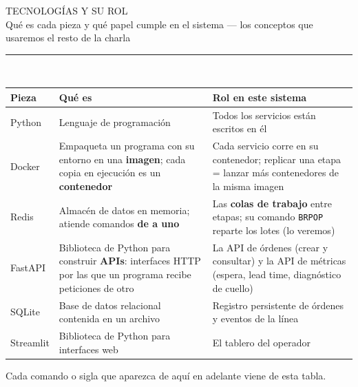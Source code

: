 \documentclass[aspectratio=169,10pt]{beamer}
\newcommand{\titulo}[2]{%
  \vspace{0.12cm}%
  {\dinfont\LARGE\color{marino}\MakeUppercase{#1}}\\[0.3ex]
  {\normalsize\color{grisazul}#2}\\[0.2ex]
  {\color{tealu}\rule{2.2cm}{2pt}}\\[0.6ex]}
\begin{document}
\begin{frame}
\titulo{Tecnologías y su rol}{Qué es cada pieza y qué papel cumple en el sistema — los conceptos que usaremos el resto de la charla}
\begin{center}
{\footnotesize\setlength{\tabcolsep}{4pt}
\begin{tabular}{L{1.5cm} L{5.4cm} L{5.7cm}}
\toprule
\textbf{Pieza} & \textbf{Qué es} & \textbf{Rol en este sistema} \\
\midrule
Python & Lenguaje de programación & Todos los servicios están escritos en él \\
Docker & Empaqueta un programa con su entorno en una \textbf{imagen}; cada copia en ejecución es un \textbf{contenedor} & Cada servicio corre en su contenedor; replicar una etapa = lanzar más contenedores de la misma imagen \\
Redis & Almacén de datos en memoria; atiende comandos \textbf{de a uno} & Las \textbf{colas de trabajo} entre etapas; su comando \texttt{BRPOP} reparte los lotes (lo veremos) \\
FastAPI & Biblioteca de Python para construir \textbf{APIs}: interfaces HTTP por las que un programa recibe peticiones de otro & La API de órdenes (crear y consultar) y la API de métricas (espera, lead time, diagnóstico de cuello) \\
SQLite & Base de datos relacional contenida en un archivo & Registro persistente de órdenes y eventos de la línea \\
Streamlit & Biblioteca de Python para interfaces web & El tablero del operador \\
\bottomrule
\end{tabular}}
\end{center}
{\small Cada comando o sigla que aparezca de aquí en adelante viene de esta tabla.}
\end{frame}
\end{document}
